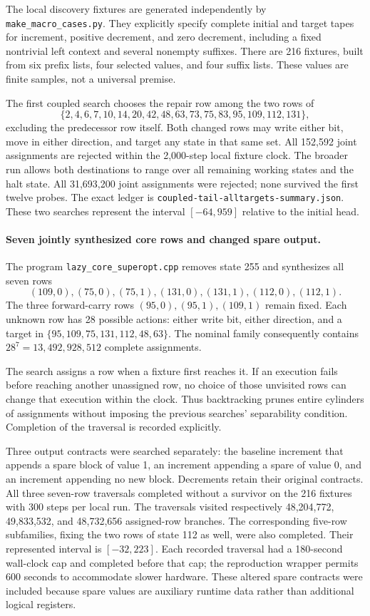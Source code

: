 The local discovery fixtures are generated independently by
\texttt{make\_macro\_cases.py}. They explicitly specify complete initial and
target tapes for increment, positive decrement, and zero decrement, including
a fixed nontrivial left context and several nonempty suffixes. There are 216
fixtures, built from six prefix lists, four selected values, and four suffix
lists. These values are finite samples, not a universal premise.

The first coupled search chooses the repair row among the two rows of
\[
 \{2,4,6,7,10,14,20,42,48,63,73,75,83,95,109,112,131\},
\]
excluding the predecessor row itself. Both changed rows may write either bit,
move in either direction, and target any state in that same set. All 152,592
joint assignments are rejected within the 2,000-step local fixture clock.
The broader run allows both destinations to range over all remaining working
states and the halt state. All 31,693,200 joint assignments were rejected;
none survived the first twelve probes. The exact ledger is
\texttt{coupled-tail-alltargets-summary.json}. These two searches represent
the interval $[-64,959]$ relative to the initial head.

\paragraph{Seven jointly synthesized core rows and changed spare output.}
The program \texttt{lazy\_core\_superopt.cpp} removes state 255 and synthesizes
all seven rows
\[
 (109,0),(75,0),(75,1),(131,0),(131,1),(112,0),(112,1).
\]
The three forward-carry rows $(95,0),(95,1),(109,1)$ remain fixed. Each unknown
row has 28 possible actions: either write bit, either direction, and a target
in $\{95,109,75,131,112,48,63\}$. The nominal family consequently contains
$28^7=13,492,928,512$ complete assignments.

The search assigns a row when a fixture first reaches it. If an execution
fails before reaching another unassigned row, no choice of those unvisited
rows can change that execution within the clock. Thus backtracking prunes
entire cylinders of assignments without imposing the previous searches'
separability condition. Completion of the traversal is recorded explicitly.

Three output contracts were searched separately: the baseline increment that
appends a spare block of value 1, an increment appending a spare of value 0,
and an increment appending no new block. Decrements retain their original
contracts. All three seven-row traversals completed without a survivor on the
216 fixtures with 300 steps per local run. The traversals visited respectively
48,204,772, 49,833,532, and 48,732,656 assigned-row branches. The corresponding
five-row subfamilies, fixing the two rows of state 112 as well, were also
completed. Their represented interval is $[-32,223]$. Each recorded traversal
had a 180-second wall-clock cap and completed before that cap; the reproduction
wrapper permits 600 seconds to accommodate slower hardware. These altered
spare contracts were included because spare values
are auxiliary runtime data rather than additional logical registers.

